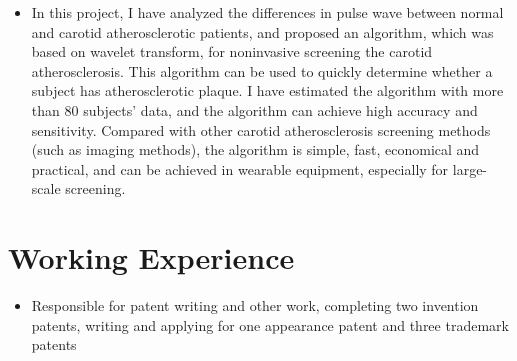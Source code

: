 \documentclass[11pt,a4paper,sans]{moderncv} %
\begin{document}

{
\begin{itemize}
\item In this project, I have analyzed the differences in pulse wave between normal and carotid atherosclerotic patients, and proposed an algorithm, which was based on wavelet transform, for noninvasive screening the carotid atherosclerosis. This algorithm can be used to quickly determine whether a subject has atherosclerotic plaque. I have estimated the algorithm with more than 80 subjects' data, and the algorithm can achieve high accuracy and sensitivity. Compared with other carotid atherosclerosis screening methods (such as imaging methods), the algorithm is simple, fast, economical and practical, and can be achieved in wearable equipment, especially for large-scale screening.
\end{itemize}
}


\section{Working Experience}
{
\begin{itemize}
\item Responsible for patent writing and other work, completing two invention patents, writing and applying for one appearance patent and three trademark patents
\end{itemize}
}  

%	
\end{document}
